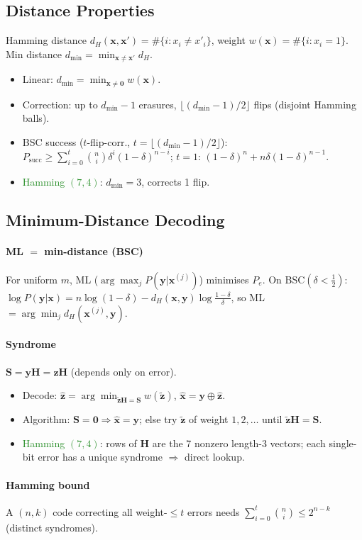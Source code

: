 \subsection{Distance Properties}
Hamming distance $d_H(\mathbf x,\mathbf x')=\#\{i:x_i\neq x'_i\}$, weight $w(\mathbf x)=\#\{i:x_i=1\}$. Min distance $d_{\min}=\min_{\mathbf x\neq\mathbf x'}d_H$.
\begin{itemize}
  \item \textcolor{Bittersweet}{Linear}: $d_{\min}=\min_{\mathbf x\neq\mathbf 0}w(\mathbf x)$.
  \item \textcolor{Bittersweet}{Correction}: up to $d_{\min}-1$ erasures, $\lfloor(d_{\min}-1)/2\rfloor$ flips (disjoint Hamming balls).
  \item \textcolor{Bittersweet}{BSC success} ($t$-flip-corr., $t{=}\lfloor(d_{\min}{-}1)/2\rfloor$): $P_{\text{succ}}\ge\sum_{i=0}^{t}\binom{n}{i}\delta^i(1{-}\delta)^{n-i}$; $t{=}1$: $(1{-}\delta)^n+n\delta(1{-}\delta)^{n-1}$.
  \item \textcolor{ForestGreen}{Hamming $(7,4)$}: $d_{\min}=3$, corrects 1 flip.
\end{itemize}
\subsection{Minimum-Distance Decoding}
\paragraph{ML $=$ min-distance (BSC)}
For uniform $m$, ML ($\arg\max_j P(\mathbf y|\mathbf x^{(j)})$) minimises $P_e$. On BSC$(\delta<\tfrac12)$: $\log P(\mathbf y|\mathbf x)=n\log(1-\delta)-d_H(\mathbf x,\mathbf y)\log\tfrac{1-\delta}{\delta}$, so ML $=\arg\min_j d_H(\mathbf x^{(j)},\mathbf y)$.

\paragraph{Syndrome} $\mathbf S=\mathbf y\mathbf H=\mathbf z\mathbf H$ (depends only on error).
\begin{itemize}
  \item Decode: $\hat{\mathbf z}=\arg\min_{\tilde{\mathbf z}\mathbf H=\mathbf S} w(\tilde{\mathbf z})$, $\hat{\mathbf x}=\mathbf y\oplus\hat{\mathbf z}$.
  \item \textcolor{Bittersweet}{Algorithm}: $\mathbf S=\mathbf 0\Rightarrow\hat{\mathbf x}=\mathbf y$; else try $\tilde{\mathbf z}$ of weight $1,2,\dots$ until $\tilde{\mathbf z}\mathbf H=\mathbf S$.
  \item \textcolor{ForestGreen}{Hamming $(7,4)$}: rows of $\mathbf H$ are the 7 nonzero length-3 vectors; each single-bit error has a unique syndrome $\Rightarrow$ direct lookup.
\end{itemize}

\paragraph{Hamming bound} A $(n,k)$ code correcting all weight-$\le t$ errors needs $\sum_{i=0}^{t}\binom{n}{i}\le 2^{n-k}$ (distinct syndromes).

